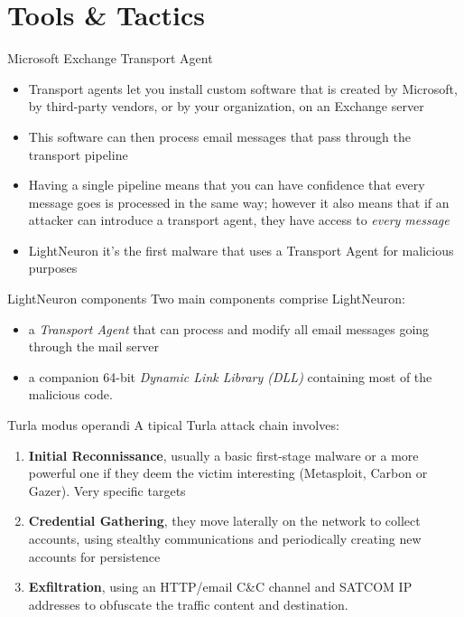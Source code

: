 \section{Tools \& Tactics}

\begin{frame}[fragile]{Microsoft Exchange Transport Agent}
    \begin{itemize}
        \item Transport agents let you install custom software that is created by Microsoft, by third-party vendors, or by your organization, on an Exchange server \cite{transMicro}
        \item This software can then process email messages that pass through the transport pipeline
        \item Having a single pipeline means that you can have confidence that every message goes is processed in the same way; however it also means that if an attacker can introduce a transport agent, they have access to \emph{every message}
        \item LightNeuron it's the first malware that uses a Transport Agent for malicious purposes
    \end{itemize}
\end{frame}

\begin{frame}[fragile]{LightNeuron components}
    Two main components comprise LightNeuron: 
    \begin{itemize}
        \item a \emph{Transport Agent} that can process and modify all email messages going through the mail server 
        \item a companion 64-bit \emph{Dynamic Link Library (DLL)} containing most of the malicious code.
    \end{itemize}
\end{frame}


\begin{frame}[fragile]{Turla modus operandi}
    A tipical Turla attack chain involves:
    \begin{enumerate}
        \item \textbf{Initial Reconnissance}, usually a basic first-stage malware or a more powerful one if they deem the victim interesting (Metasploit, Carbon or Gazer). Very specific targets
        \item \textbf{Credential Gathering}, they move laterally on the network to collect accounts, using stealthy communications and periodically creating new accounts for persistence
        \item \textbf{Exfiltration}, using an HTTP/email C\&C channel and SATCOM IP addresses to obfuscate the traffic content and destination. 
    \end{enumerate}
    
\end{frame}

